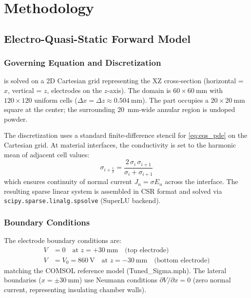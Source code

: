 \documentclass[10pt,twocolumn]{article}
\newcommand{\half}{\tfrac{1}{2}}
\begin{document}
\section{Methodology}
\label{sec:methodology}

\subsection{Electro-Quasi-Static Forward Model}
\label{sec:eqs_model}

\subsubsection{Governing Equation and Discretization}

 is solved on a 2D Cartesian grid representing the
XZ cross-section (horizontal = $x$, vertical = $z$, electrodes on the
$z$-axis).  The domain is $60 \times \SI{60}{\milli\meter}$ with
$120 \times 120$ uniform cells ($\Delta x = \Delta z \approx
\SI{0.504}{\milli\meter}$).  The part occupies a $20 \times
\SI{20}{\milli\meter}$ square at the center; the surrounding
\SI{20}{\milli\meter}-wide annular region is undoped powder.

The discretization uses a standard finite-difference stencil for
\cref{eq:eqs_pde} on the Cartesian grid.  At material interfaces, the
conductivity is set to the harmonic mean of adjacent cell values:
\begin{equation}
  \sigma_{i+\half} =
  \frac{2\,\sigma_i\,\sigma_{i+1}}{\sigma_i + \sigma_{i+1}}
  \label{eq:harmonic_sigma}
\end{equation}
which ensures continuity of normal current $J_n = \sigma E_n$ across
the interface.  The resulting sparse linear system is assembled in
CSR format and solved via \texttt{scipy.sparse.linalg.spsolve}
(SuperLU backend).

\subsubsection{Boundary Conditions}

The electrode boundary conditions are:
\begin{align}
  V &= 0 \quad \text{at } z = +\SI{30}{\milli\meter} \quad
       \text{(top electrode)} \label{eq:bc_top}\\
  V &= V_0 = \SI{860}{\volt} \quad \text{at } z = -\SI{30}{\milli\meter}
       \quad \text{(bottom electrode)} \label{eq:bc_bot}
\end{align}
matching the COMSOL reference model (Tuned\_Sigma.mph).  The lateral
boundaries ($x = \pm\SI{30}{\milli\meter}$) use Neumann conditions
$\partial V/\partial x = 0$ (zero normal current, representing
insulating chamber walls).
\end{document}
